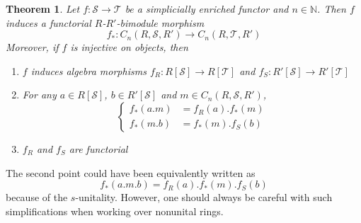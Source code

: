 \documentclass[a4paper,fleqn]{cas-sc}
\newtheorem{thm}{Theorem}%
\newcommand{\cS}{{\mathcal{S}}}
\newcommand{\cT}{{\mathcal{T}}}
\begin{document}
\begin{thm}
\label{thm:15}
Let $f : \cS \to \cT$ be a simplicially enriched functor  and $n \in \mathbb{N}$. 
Then $f$ induces a functorial $R$-$R'$-bimodule morphism \[f_* : C_n(R, \cS, R') \to C_n(R, \cT, R')\]
Moreover, if $f$ is injective on objects, then
\begin{enumerate}
    \item[1)] $f$ induces algebra morphisms $f_R : R[\cS] \to R[\cT]$ and $f_S : R'[\cS] \to R'[\cT]$
    \item[2)] For any $a \in R[\cS]$, $b \in R'[\cS]$ and $m \in C_n \left( R, \cS , R' \right)$,
    \begin{equation*}
    \left\{
    \begin{aligned}
      f_* (a.m) &= f_R (a). f_* (m) \\
      f_* (m.b) &=  f_* (m) . f_S(b)
    \end{aligned}
    \right.
    \end{equation*}
    \item[3)] $f_R$ and $f_S$ are functorial
\end{enumerate}
\end{thm}

The second point could have been equivalently written as
\[f_* (a.m.b) = f_R (a). f_* (m) . f_S(b)\]
because of the $s$-unitality. However, one should always be careful with such simplifications when working over nonunital rings. 
\end{document}
